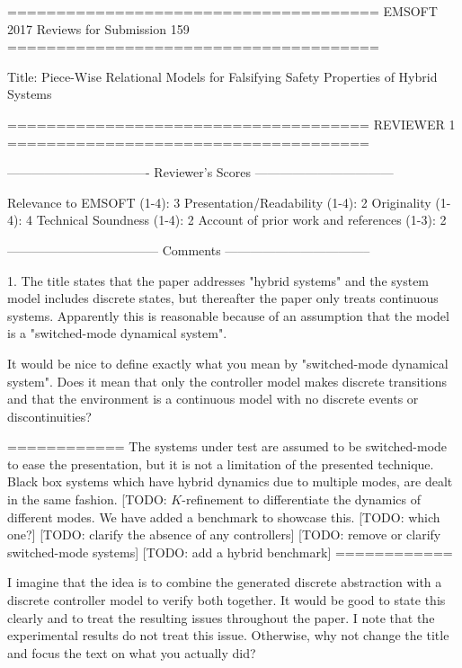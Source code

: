 \obeyspaces
\obeylines
======================================
EMSOFT 2017 Reviews for Submission 159
======================================

Title: Piece-Wise Relational Models for Falsifying Safety Properties of Hybrid Systems

=====================================
                            REVIEWER 1
=====================================


----------------------------------
Reviewer's Scores
---------------------------------

               Relevance to EMSOFT (1-4): 3
          Presentation/Readability (1-4): 2
                       Originality (1-4): 4
               Technical Soundness (1-4): 2
Account of prior work and references (1-3): 2


------------------------------------
Comments
-----------------------------------


1. The title states that the paper addresses "hybrid systems" and the system
   model includes discrete states, but thereafter the paper only treats
   continuous systems. Apparently this is reasonable because of an
   assumption that the model is a "switched-mode dynamical system".

   It would be nice to define exactly what you mean by "switched-mode
   dynamical system". Does it mean that only the controller model makes
   discrete transitions and that the environment is a continuous model with
   no discrete events or discontinuities?

   ============
   The systems under test are assumed to be switched-mode to ease the
   presentation, but it is not a limitation of the presented
   technique. Black box systems which have hybrid dynamics due to
   multiple modes, are dealt in the same fashion.
   [TODO: $K$-refinement to differentiate the dynamics of different modes.
   We have added a benchmark to showcase this.
   [TODO: which one?]
   [TODO: clarify the absence of any controllers]
   [TODO: remove or clarify switched-mode systems]
   [TODO: add a hybrid benchmark]
   ============

   I imagine that the idea is to combine the generated discrete abstraction
   with a discrete controller model to verify both together. It would be
   good to state this clearly and to treat the resulting issues throughout
   the paper. I note that the experimental results do not treat this issue.
   Otherwise, why not change the title and focus the text on what you
   actually did?

